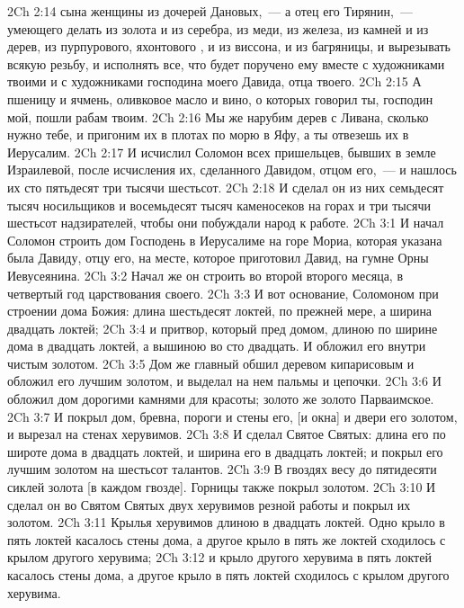 \vs 2Ch 2:14 сына  женщины из дочерей Дановых,~--- а отец его Тирянин,~--- умеющего делать  из золота и из серебра, из меди, из железа, из камней и из дерев, из  пурпурового, яхонтового , и из виссона, и из багряницы, и вырезывать всякую резьбу, и исполнять все, что будет поручено ему вместе с художниками твоими и с художниками господина моего Давида, отца твоего.
\vs 2Ch 2:15 А пшеницу и ячмень, оливковое масло и вино, о которых говорил ты, господин мой, пошли рабам твоим.
\vs 2Ch 2:16 Мы же нарубим дерев с Ливана, сколько нужно тебе, и пригоним их в плотах по морю в Яфу, а ты отвезешь их в Иерусалим.
\rsbpar\vs 2Ch 2:17 И исчислил Соломон всех пришельцев, бывших  в земле Израилевой, после исчисления их, сделанного Давидом, отцом его,~--- и нашлось их сто пятьдесят три тысячи шестьсот.
\vs 2Ch 2:18 И сделал он из них семьдесят тысяч носильщиков и восемьдесят тысяч каменосеков на горах и три тысячи шестьсот надзирателей, чтобы они побуждали народ к работе.
\vs 2Ch 3:1 И начал Соломон строить дом Господень в Иерусалиме на горе Мориа, которая указана была Давиду, отцу его, на месте, которое приготовил Давид, на гумне Орны Иевусеянина.
\vs 2Ch 3:2 Начал же он строить во второй  второго месяца, в четвертый год царствования своего.
\vs 2Ch 3:3 И вот основание,  Соломоном при строении дома Божия: длина  шестьдесят локтей, по прежней мере, а ширина двадцать локтей;
\vs 2Ch 3:4 и притвор, который пред домом, длиною по ширине дома в двадцать локтей, а вышиною во сто двадцать. И обложил его внутри чистым золотом.
\vs 2Ch 3:5 Дом же главный обшил деревом кипарисовым и обложил его лучшим золотом, и выделал на нем пальмы и цепочки.
\vs 2Ch 3:6 И обложил дом дорогими камнями для красоты; золото же  золото Парваимское.
\vs 2Ch 3:7 И покрыл дом, бревна, пороги и стены его, [и окна] и двери его золотом, и вырезал на стенах херувимов.
\vs 2Ch 3:8 И сделал Святое Святых: длина его по широте дома в двадцать локтей, и ширина его в двадцать локтей; и покрыл его лучшим золотом на шестьсот талантов.
\vs 2Ch 3:9 В гвоздях весу до пятидесяти сиклей золота [в каждом гвозде]. Горницы также покрыл золотом.
\vs 2Ch 3:10 И сделал он во Святом Святых двух херувимов резной работы и покрыл их золотом.
\vs 2Ch 3:11 Крылья херувимов длиною  в двадцать локтей. Одно крыло в пять локтей касалось стены дома, а другое крыло в пять же локтей сходилось с крылом другого херувима;
\vs 2Ch 3:12  и крыло другого херувима в пять локтей касалось стены дома, а другое крыло в пять локтей сходилось с крылом другого херувима.
